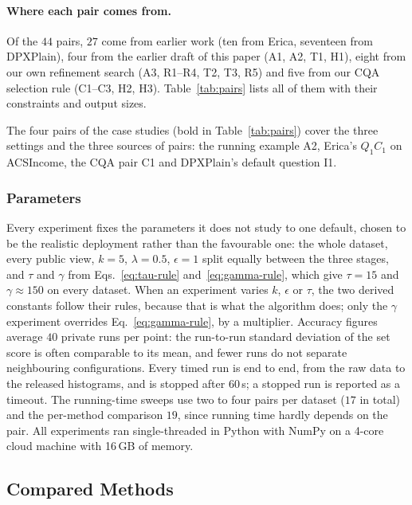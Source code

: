 \paragraph{Where each pair comes from.}
Of the $44$ pairs, $27$ come from earlier work (ten from Erica, seventeen from DPXPlain), four from the earlier draft of this paper (A1, A2, T1, H1), eight from our own refinement search (A3, R1--R4, T2, T3, R5) and five from our CQA selection rule (C1--C3, H2, H3).
Table~\ref{tab:pairs} lists all of them with their constraints and output sizes.

The four pairs of the case studies (bold in Table~\ref{tab:pairs}) cover the three settings and the three sources of pairs: the running example A2, Erica's $Q_1C_1$ on ACSIncome, the CQA pair C1 and DPXPlain's default question I1.



\subsubsection{Parameters}
\label{subsubsec:parameters}

Every experiment fixes the parameters it does not study to one default, chosen to be the realistic deployment rather than the favourable one: the whole dataset, every public view, $k=5$, $\lambda=0.5$, $\epsilon=1$ split equally between the three stages, and $\tau$ and $\gamma$ from Eqs.~\eqref{eq:tau-rule} and~\eqref{eq:gamma-rule}, which give $\tau=15$ and $\gamma\approx150$ on every dataset.
When an experiment varies $k$, $\epsilon$ or $\tau$, the two derived constants follow their rules, because that is what the algorithm does; only the $\gamma$ experiment overrides Eq.~\eqref{eq:gamma-rule}, by a multiplier.
Accuracy figures average $40$ private runs per point: the run-to-run standard deviation of the set score is often comparable to its mean, and fewer runs do not separate neighbouring configurations.
Every timed run is end to end, from the raw data to the released histograms, and is stopped after $60$\,s; a stopped run is reported as a timeout.
The running-time sweeps use two to four pairs per dataset ($17$ in total) and the per-method comparison $19$, since running time hardly depends on the pair.
All experiments ran single-threaded in Python with NumPy on a 4-core cloud machine with 16\,GB of memory.

\subsection{Compared Methods}
\label{subsec:compared-methods}

